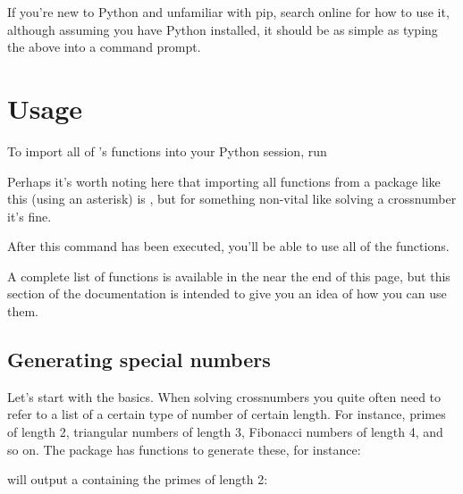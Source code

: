\documentclass[letterpaper,10pt,english]{sphinxmanual}
\begin{document}
If you’re new to Python and unfamiliar with pip, search online for how to use it, although assuming you have Python installed, it should be as simple as typing the above into a command prompt.


\chapter{Usage}
\label{\detokenize{index:usage}}
To import all of ’s functions into your Python session, run

\begin{sphinxVerbatim}[commandchars=\\\{\}]
   
\end{sphinxVerbatim}

Perhaps it’s worth noting here that importing all functions from a package like this (using an asterisk) is , but for something non-vital like solving a crossnumber it’s fine.

After this command has been executed, you’ll be able to use all of the  functions.

A complete list of functions is available in the {\hyperref[\detokenize{index:list-of-functions}]{}} near the end of this page, but this section of the documentation is intended to give you an idea of how you can use them.


\section{Generating special numbers}
\label{\detokenize{index:generating-special-numbers}}
Let’s start with the basics. When solving crossnumbers you quite often need to refer to a list of a certain type of number of certain length. For instance, primes of length 2, triangular numbers of length 3, Fibonacci numbers of length 4, and so on. The  package has functions to generate these, for instance:

\begin{sphinxVerbatim}[commandchars=\\\{\}]
\end{sphinxVerbatim}

will output a  containing the primes of length 2:
\end{document}
